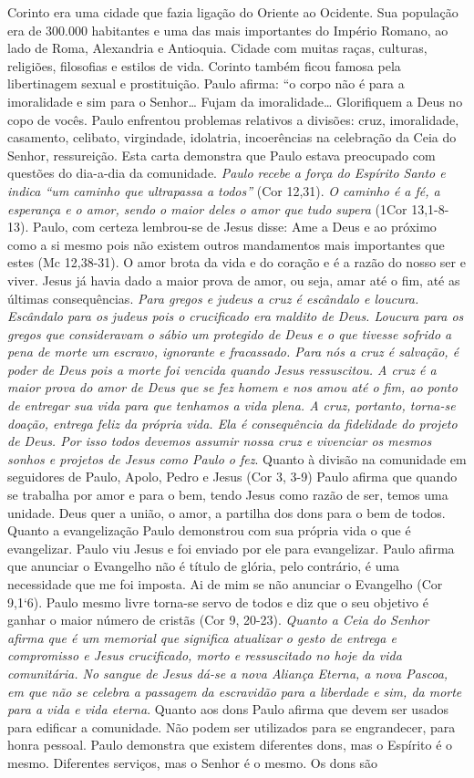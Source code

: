 \documentclass[
]{book}
\begin{document}
Corinto era uma cidade que fazia ligação do Oriente ao Ocidente. Sua população era de 300.000 habitantes e uma das mais importantes do Império Romano, ao lado de Roma, Alexandria e Antioquia. Cidade com muitas raças, culturas, religiões, filosofias e estilos de vida. Corinto também ficou famosa pela libertinagem sexual e prostituição. Paulo afirma: ``o corpo não é para a imoralidade e sim para o Senhor\ldots{} Fujam da imoralidade\ldots{} Glorifiquem a Deus no copo de vocês. Paulo enfrentou problemas relativos a divisões: cruz, imoralidade, casamento, celibato, virgindade, idolatria, incoerências na celebração da Ceia do Senhor, ressureição. Esta carta demonstra que Paulo estava preocupado com questões do dia-a-dia da comunidade. \emph{Paulo recebe a força do Espírito Santo e indica ``um caminho que ultrapassa a todos''} (Cor 12,31). \emph{O caminho é a fé, a esperança e o amor, sendo o maior deles o amor que tudo supera} (1Cor 13,1-8-13). Paulo, com certeza lembrou-se de Jesus disse: Ame a Deus e ao próximo como a si mesmo pois não existem outros mandamentos mais importantes que estes (Mc 12,38-31). O amor brota da vida e do coração e é a razão do nosso ser e viver. Jesus já havia dado a maior prova de amor, ou seja, amar até o fim, até as últimas consequências. \emph{Para gregos e judeus a cruz é escândalo e loucura. Escândalo para os judeus pois o crucificado era maldito de Deus. Loucura para os gregos que consideravam o sábio um protegido de Deus e o que tivesse sofrido a pena de morte um escravo, ignorante e fracassado. Para nós a cruz é salvação, é poder de Deus pois a morte foi vencida quando Jesus ressuscitou. A cruz é a maior prova do amor de Deus que se fez homem e nos amou até o fim, ao ponto de entregar sua vida para que tenhamos a vida plena. A cruz, portanto, torna-se doação, entrega feliz da própria vida. Ela é consequência da fidelidade do projeto de Deus. Por isso todos devemos assumir nossa cruz e vivenciar os mesmos sonhos e projetos de Jesus como Paulo o fez}. Quanto à divisão na comunidade em seguidores de Paulo, Apolo, Pedro e Jesus (Cor 3, 3-9) Paulo afirma que quando se trabalha por amor e para o bem, tendo Jesus como razão de ser, temos uma unidade. Deus quer a união, o amor, a partilha dos dons para o bem de todos. Quanto a evangelização Paulo demonstrou com sua própria vida o que é evangelizar. Paulo viu Jesus e foi enviado por ele para evangelizar. Paulo afirma que anunciar o Evangelho não é título de glória, pelo contrário, é uma necessidade que me foi imposta. Ai de mim se não anunciar o Evangelho (Cor 9,1`6). Paulo mesmo livre torna-se servo de todos e diz que o seu objetivo é ganhar o maior número de cristãs (Cor 9, 20-23). \emph{Quanto a Ceia do Senhor afirma que é um memorial que significa atualizar o gesto de entrega e compromisso e Jesus crucificado, morto e ressuscitado no hoje da vida comunitária. No sangue de Jesus dá-se a nova Aliança Eterna, a nova Pascoa, em que não se celebra a passagem da escravidão para a liberdade e sim, da morte para a vida e vida eterna}. Quanto aos dons Paulo afirma que devem ser usados para edificar a comunidade. Não podem ser utilizados para se engrandecer, para honra pessoal. Paulo demonstra que existem diferentes dons, mas o Espírito é o mesmo. Diferentes serviços, mas o Senhor é o mesmo. Os dons são 
\end{document}
